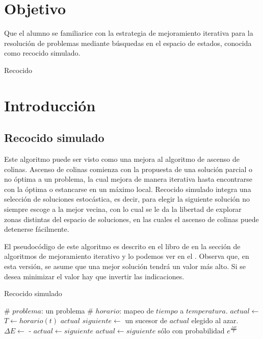 \section{Objetivo}

Que el alumno se familiarice con la estrategia de mejoramiento iterativa para la resolución de problemas mediante búsquedas en el espacio de estados, conocida como recocido simulado.

\begin{auxcode}
 \caption{Recocido}
 \centering
\end{auxcode}


\section{Introducción}

\subsection{Recocido simulado}

Este algoritmo puede ser visto como una mejora al algoritmo de ascenso de colinas.  Ascenso de colinas comienza con la propuesta de una solución parcial o no óptima a un problema, la cual mejora de manera iterativa hasta encontrarse con la óptima o estancarse en un máximo local.  Recocido simulado integra una selección de soluciones estocástica, es decir, para elegir la siguiente solución no siempre escoge a la mejor vecina, con lo cual se le da la libertad de explorar zonas distintas del espacio de soluciones, en las cuales el ascenso de colinas puede detenerse fácilmente.

El pseudocódigo de este algoritmo es descrito en el libro de  \cite{Russell2010} en la sección de algoritmos de mejoramiento iterativo y lo podemos ver en el .  Observa que, en esta versión, se asume que una mejor solución tendrá un valor más alto.  Si se desea minimizar el valor hay que invertir las indicaciones.

\begin{algorithm}
 \caption{Recocido simulado}\label{alg:annealing}
 \begin{algorithmic}
    \State \# $problema$: un problema
    \State \# $horario$: mapeo de $tiempo$ a $temperatura$.
    \State $actual \leftarrow $ 
      \State $T \leftarrow horario(t)$
        \State \Return $actual$
      \EndIf
      \State $siguiente \leftarrow$ un sucesor de $actual$ elegido al azar.
      \State $\Delta E \leftarrow$  - 
        \State $actual \leftarrow siguiente$
      \Else
        \State $actual \leftarrow siguiente$ sólo con probabilidad $e^{\frac{\Delta E}{T}}$
      \EndIf
    \EndFor
  \EndFunction
 \end{algorithmic}
\end{algorithm}



